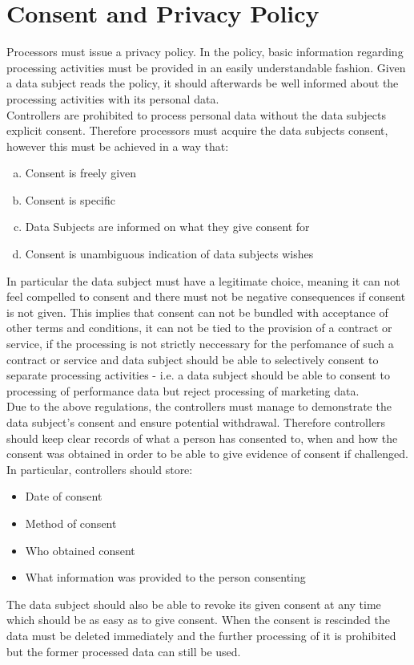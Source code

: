 \documentclass[a4paper,12pt]{report}
\begin{document}
	\section{Consent and Privacy Policy}
	\startsection
	Processors must issue a privacy policy.
	In the policy, basic information regarding processing activities must be provided in an easily understandable fashion.
	Given a data subject reads the policy, it should afterwards be well informed about the processing activities with its personal data.\\
	Controllers are prohibited to process personal data without the data subjects explicit consent.
	Therefore processors must acquire the data subjects consent, however this must be achieved in a way that:
	\begin{enumerate}[a)]
		\item Consent is freely given
		\item Consent is specific
		\item Data Subjects are informed on what they give consent for
		\item Consent is unambiguous indication of data subjects wishes
	\end{enumerate}
	In particular the data subject must have a legitimate choice, meaning it can not feel compelled to consent and there must not be negative consequences if consent is not given.
	This implies that consent can not be bundled with acceptance of other terms and conditions, 
	it can not be tied to the provision of a contract or service, if the processing is not strictly neccessary for the perfomance of such a contract or service and
	data subject should be able to selectively consent to separate processing activities - i.e. a data subject should be able to consent to processing of performance data but reject processing of marketing data.\\
	Due to the above regulations, the controllers must manage to demonstrate the data subject's consent and ensure potential withdrawal.
	Therefore controllers should keep clear records of what a person has consented to, when and how the consent was obtained in order to be able to give evidence of consent if challenged. 
	In particular, controllers should store:
	\begin{itemize}
		\item Date of consent
		\item Method of consent
		\item Who obtained consent
		\item What information was provided to the person consenting
	\end{itemize}
	The data subject should also be able to revoke its given consent at any time which should be as easy as to give consent. When the consent is rescinded the data must be deleted immediately and the further processing of it is prohibited but the former processed data can still be used.
	\closesection
\end{document}
